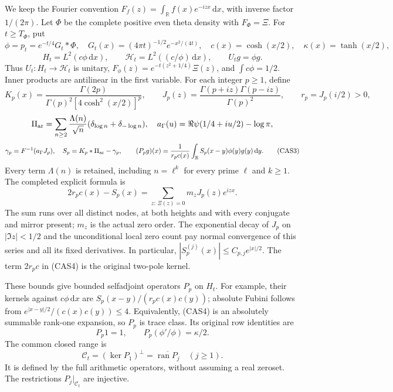 \documentclass[11pt]{article}
\theoremstyle{remark}\newtheorem{remark}[theorem]{Remark}
\newcommand{\R}{\mathbb R}
\newcommand{\dd}{\,\mathrm d}
\begin{document}
We keep the Fourier convention
\(F_f(z)=\int_{\R}f(x)e^{-izx}\dd x\), with inverse factor
\(1/(2\pi)\). Let \(\Phi\) be the complete positive even theta density
with \(F_\Phi=\Xi\). For \(t\ge T_\Phi\), put
\[
 \phi=p_t=e^{-t/4}G_t*\Phi,\quad
 G_t(x)=(4\pi t)^{-1/2}e^{-x^2/(4t)},\quad
 c(x)=\cosh(x/2),\quad \kappa(x)=\tanh(x/2),
\]
\[
 H_t=L^2(c\phi\dd x),\qquad
 \mathcal H_t=L^2((c/\phi)\dd x),\qquad U_tg=\phi g.
                                                        \tag{CAS1}
\]
Thus \(U_t:H_t\to\mathcal H_t\) is unitary,
\(F_\phi(z)=e^{-t(z^2+1/4)}\Xi(z)\), and
\(\int c\phi=1/2\). Inner products are antilinear in the first
variable. For each integer \(p\ge1\), define
\[
 K_p(x)=\frac{\Gamma(2p)}{\Gamma(p)^2[4\cosh^2(x/2)]^p},\qquad
 J_p(z)=\frac{\Gamma(p+iz)\Gamma(p-iz)}{\Gamma(p)^2},\qquad
 r_p=J_p(i/2)>0,
                                                        \tag{CAS2}
\]
\[
 \Pi_{\rm ar}=\sum_{n\ge2}\frac{\Lambda(n)}{\sqrt n}
             (\delta_{\log n}+\delta_{-\log n}),\quad
 a_\Gamma(u)=\Re\psi(1/4+iu/2)-\log\pi,
\]
\[
 \gamma_p=F^{-1}(a_\Gamma J_p),\quad
 S_p=K_p*\Pi_{\rm ar}-\gamma_p,
 \qquad
 (P_pg)(x)=\frac1{r_pc(x)}\int_\R S_p(x-y)\phi(y)g(y)\dd y.
                                                        \tag{CAS3}
\]
Every term \(\Lambda(n)\) is retained, including \(n=\ell^k\) for
every prime \(\ell\) and \(k\ge1\). The completed explicit formula is
\[
 2r_pc(x)-S_p(x)
      =\sum_{z:\,\Xi(z)=0}m_zJ_p(z)e^{izx}.              \tag{CAS4}
\]
The sum runs over all distinct nodes, at both heights and with every
conjugate and mirror present; \(m_z\) is the actual zero order.
The exponential decay of \(J_p\) on \(|\Im z|<1/2\) and the
unconditional local zero count pay normal convergence of this series
and all its fixed derivatives. In particular,
\( |S_p^{(j)}(x)|\le C_{p,j}e^{|x|/2}\).
The term \(2r_pc\) in (CAS4) is the original two-pole kernel.

These bounds give bounded selfadjoint operators \(P_p\) on \(H_t\).
For example, their kernels against \(c\phi\dd x\) are
\(S_p(x-y)/(r_pc(x)c(y))\); absolute Fubini follows from
\(e^{|x-y|/2}/(c(x)c(y))\le4\).
Equivalently, (CAS4) is an absolutely summable rank-one expansion,
so \(P_p\) is trace class. Its original row identities are
\[
 P_p1=1,\qquad P_p(\phi'/\phi)=\kappa/2.                 \tag{CAS5}
\]
The common closed range is
\[
 \mathcal C_t=(\ker P_1)^{\perp}
      =\overline{\operatorname{ran}P_j}\quad(j\ge1).
                                                        \tag{CAS6}
\]
It is defined by the full arithmetic operators, without assuming a
real zeroset. The restrictions \(P_j|_{\mathcal C_t}\) are injective.
\end{document}
